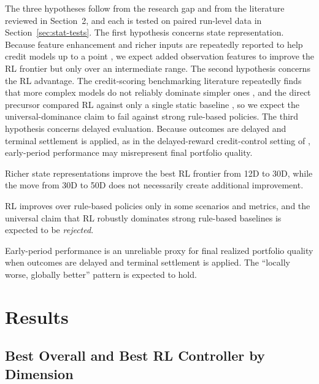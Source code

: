 \documentclass[preprint,review,authoryear,12pt]{elsarticle}
\begin{document}
The three hypotheses follow from the research gap and from the literature reviewed in
Section~2, and each is tested on paired run-level data in Section~\ref{sec:stat-tests}.
The first hypothesis concerns state representation. Because feature enhancement and
richer inputs are repeatedly reported to help credit models up to a point
\citep{yang2024}, we expect added observation features to improve the RL
frontier but only over an intermediate range. The second hypothesis concerns the RL
advantage. The credit-scoring benchmarking literature repeatedly finds that more complex
models do not reliably dominate simpler ones \citep{lessmann2015, gunnarsson2021}, and
the direct precursor compared RL against only a single static baseline
\citep{herasymovych2019, kiatsupaibul2024}, so we expect the universal-dominance claim to
fail against strong rule-based policies. The third hypothesis concerns delayed
evaluation. Because outcomes are delayed and terminal settlement is applied, as in the
delayed-reward credit-control setting of \citet{herasymovych2019}, early-period
performance may misrepresent final portfolio quality.

\begin{description}[leftmargin=2.2em,style=nextline]
    \item[H1 (State representation).] Richer state representations improve the best RL
          frontier from 12D to 30D, while the move from 30D to 50D does not necessarily
          create additional improvement.
    \item[H2 (RL vs.\ rule-based).] RL improves over rule-based policies only in some
          scenarios and metrics, and the universal claim that RL robustly dominates strong
          rule-based baselines is expected to be \emph{rejected}.
    \item[H3 (Delayed evaluation).] Early-period performance is an unreliable proxy for
          final realized portfolio quality when outcomes are delayed and terminal
          settlement is applied. The ``locally worse, globally better'' pattern is expected
          to hold.
\end{description}

\section{Results}

\subsection{Best Overall and Best RL Controller by Dimension}
\end{document}
